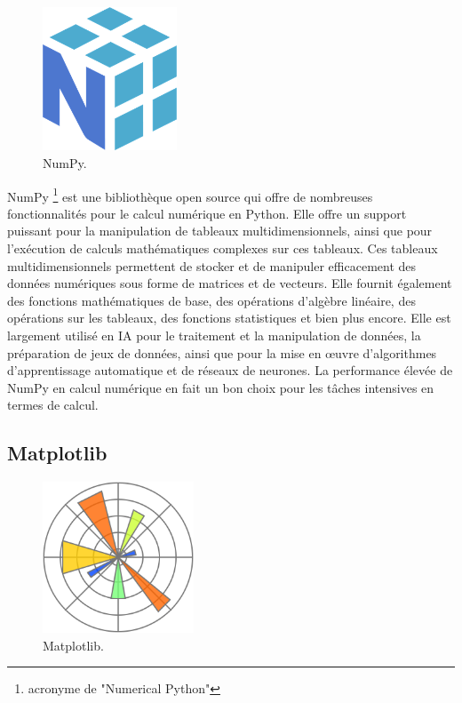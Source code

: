 \begin{figure}[hbt!]
  \centering
  \includegraphics[width=4cm]{images_pfe/numpy.png}
  \caption{NumPy.}
  \label{fig:numpy}
\end{figure}
\FloatBarrier
\medskip

NumPy \footnote{acronyme de "Numerical Python"} est une bibliothèque open source qui offre de nombreuses fonctionnalités pour le calcul numérique en Python. Elle offre un support puissant pour la manipulation de tableaux multidimensionnels, ainsi que pour l'exécution de calculs mathématiques complexes sur ces tableaux. Ces tableaux multidimensionnels permettent de stocker et de manipuler efficacement des données numériques sous forme de matrices et de vecteurs. Elle fournit également des fonctions mathématiques de base, des opérations d'algèbre linéaire, des opérations sur les tableaux, des fonctions statistiques et bien plus encore. Elle est largement utilisé en IA pour le traitement et la manipulation de données, la préparation de jeux de données, ainsi que pour la mise en œuvre d'algorithmes d'apprentissage automatique et de réseaux de neurones. La performance élevée de NumPy en calcul numérique en fait un bon choix pour les tâches intensives en termes de calcul.


\subsection{Matplotlib}
\begin{figure}[hbt!]
  \centering
  \includegraphics[width=4.5cm]{images_pfe/matplotlib.png}
  \caption{Matplotlib.}
  \label{fig:matplotlib}
\end{figure}
\FloatBarrier
\medskip

